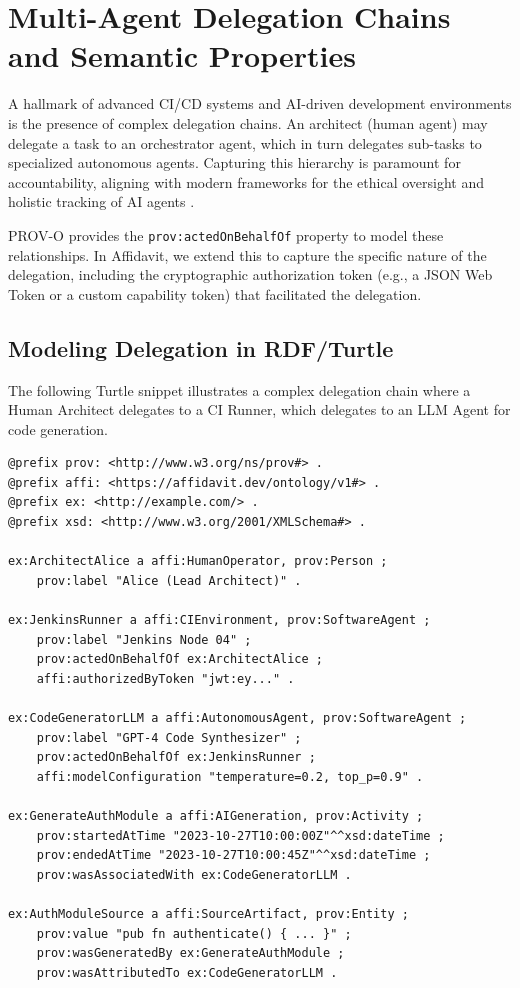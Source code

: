 \section{Multi-Agent Delegation Chains and Semantic Properties}

A hallmark of advanced CI/CD systems and AI-driven development environments is the presence of complex delegation chains. An architect (human agent) may delegate a task to an orchestrator agent, which in turn delegates sub-tasks to specialized autonomous agents. Capturing this hierarchy is paramount for accountability, aligning with modern frameworks for the ethical oversight and holistic tracking of AI agents \cite{ref_OntheETHOSofAIA25}.

PROV-O provides the \texttt{prov:actedOnBehalfOf} property to model these relationships. In Affidavit, we extend this to capture the specific nature of the delegation, including the cryptographic authorization token (e.g., a JSON Web Token or a custom capability token) that facilitated the delegation.

\subsection{Modeling Delegation in RDF/Turtle}

The following Turtle snippet illustrates a complex delegation chain where a Human Architect delegates to a CI Runner, which delegates to an LLM Agent for code generation.

\begin{verbatim}
@prefix prov: <http://www.w3.org/ns/prov#> .
@prefix affi: <https://affidavit.dev/ontology/v1#> .
@prefix ex: <http://example.com/> .
@prefix xsd: <http://www.w3.org/2001/XMLSchema#> .

ex:ArchitectAlice a affi:HumanOperator, prov:Person ;
    prov:label "Alice (Lead Architect)" .

ex:JenkinsRunner a affi:CIEnvironment, prov:SoftwareAgent ;
    prov:label "Jenkins Node 04" ;
    prov:actedOnBehalfOf ex:ArchitectAlice ;
    affi:authorizedByToken "jwt:ey..." .

ex:CodeGeneratorLLM a affi:AutonomousAgent, prov:SoftwareAgent ;
    prov:label "GPT-4 Code Synthesizer" ;
    prov:actedOnBehalfOf ex:JenkinsRunner ;
    affi:modelConfiguration "temperature=0.2, top_p=0.9" .

ex:GenerateAuthModule a affi:AIGeneration, prov:Activity ;
    prov:startedAtTime "2023-10-27T10:00:00Z"^^xsd:dateTime ;
    prov:endedAtTime "2023-10-27T10:00:45Z"^^xsd:dateTime ;
    prov:wasAssociatedWith ex:CodeGeneratorLLM .

ex:AuthModuleSource a affi:SourceArtifact, prov:Entity ;
    prov:value "pub fn authenticate() { ... }" ;
    prov:wasGeneratedBy ex:GenerateAuthModule ;
    prov:wasAttributedTo ex:CodeGeneratorLLM .
\end{verbatim}

